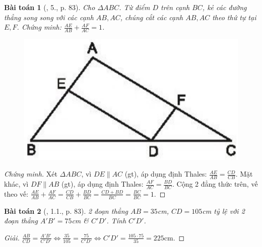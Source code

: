 \documentclass{article}
\newtheorem{baitoan}{Bài toán}
\begin{document}
\begin{baitoan}[\cite{SBT_Toan_8_tap_2}, 5., p. 83]
	\label{SBT_Toan_8_tap_2 5. p. 83}
	Cho $\Delta ABC$. Từ điểm $D$ trên cạnh $BC$, kẻ các đường thẳng song song với các cạnh $AB,AC$, chúng cắt các cạnh $AB,AC$ theo thứ tự tại $E,F$. Chứng minh: $\frac{AE}{AB} + \frac{AF}{AC} = 1$.
	\begin{figure}[H]
		\centering
		\includegraphics[scale=0.2]{SBT_Toan_8_43}
	\end{figure}
\end{baitoan}

\begin{proof}[Chứng minh]
	
	Xét $\Delta ABC$, vì $DE\parallel AC$ (gt), áp dụng định Thales: $\frac{AE}{AB} = \frac{CD}{CB}$. Mặt khác, vì $DF\parallel AB$ (gt), áp dụng định Thales: $\frac{AF}{AC} = \frac{BD}{BC}$. Cộng 2 đẳng thức trên, vế theo vế: $\frac{AE}{AB} + \frac{AF}{AC} = \frac{CD}{CB} + \frac{BD}{BC} = \frac{CD + BD}{BC} = \frac{BC}{BC} = 1$.
\end{proof}

\begin{baitoan}[\cite{SBT_Toan_8_tap_2}, 1.1., p. 83]
	2 đoạn thẳng $AB = 35$\emph{cm}, $CD = 105$\emph{cm} tỷ lệ với 2 đoạn thẳng $A'B' = 75$\emph{cm} \& $C'D'$. Tính $C'D'$.
\end{baitoan}

\begin{proof}[Giải]
	$\frac{AB}{CD} = \frac{A'B'}{C'D'}\Leftrightarrow\frac{35}{105} = \frac{75}{C'D'}\Leftrightarrow C'D' = \frac{105\cdot75}{35} = 225$cm.
\end{proof}
\end{document}
